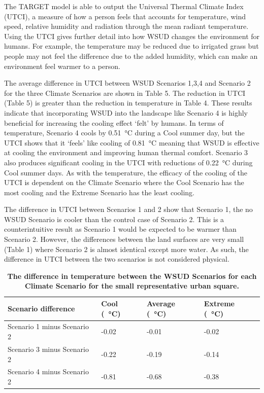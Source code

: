 \documentclass[final,3p,times,authoryear]{elsarticle}
\begin{document}
The TARGET model is able to output the Universal Thermal Climate Index (UTCI), a measure of how a person feels that accounts for temperature, wind speed, relative humidity and radiation through the mean radiant temperature. Using the UTCI gives further detail into how WSUD changes the environment for humans. For example, the temperature may be reduced due to irrigated grass but people may not feel the difference due to the added humidity, which can make an environment feel warmer to a person.

The average difference in UTCI between WSUD Scenarios 1,3,4 and Scenario 2 for the three Climate Scenarios are shown in Table 5. The reduction in UTCI (Table 5) is greater than the reduction in temperature in Table 4. These results indicate that incorporating WSUD into the landscape like Scenario 4 is highly beneficial for increasing the cooling effect ‘felt’ by humans. In terms of temperature, Scenario 4 cools by 0.51\SI{}{\degreeCelsius} during a Cool summer day, but the UTCI shows that it ‘feels’ like cooling of 0.81\SI{}{\degreeCelsius} meaning that WSUD is effective at cooling the environment and improving human thermal comfort. Scenario 3 also produces significant cooling in the UTCI with reductions of 0.22\SI{}{\degreeCelsius} during Cool summer days. As with the temperature, the efficacy of the cooling of the UTCI is dependent on the Climate Scenario where the Cool Scenario has the most cooling and the Extreme Scenario has the least cooling. 

The difference in UTCI between Scenarios 1 and 2 show that Scenario 1, the no WSUD Scenario is cooler than the control case of Scenario 2. This is a counterintuitive result as Scenario 1 would be expected to be warmer than Scenario 2. However, the differences between the land surfaces are very small (Table 1) where Scenario 2 is almost identical except more water. As such, the difference in UTCI between the two scenarios is not considered physical. 


\begin{table}[!htbp]
\caption{\bf The difference in temperature between the WSUD Scenarios for each Climate Scenario for the small representative urban square. \label{tab:scenarioDiffRep2}}     
\begin{tabular}{ l l l l}
\textbf{Scenario difference} & \textbf{Cool (\SI{}{\degreeCelsius})}
& \textbf{Average (\SI{}{\degreeCelsius})}
& \textbf{Extreme (\SI{}{\degreeCelsius})}\\ \hline
Scenario 1 minus Scenario 2 & -0.02  & -0.01 & -0.02\\ 
Scenario 3 minus Scenario 2 & -0.22  & -0.19 & -0.14\\ 
Scenario 4 minus Scenario 2 & -0.81  & -0.68 & -0.38\\ 
\hline
\end{tabular}
\end{table}
\end{document}
